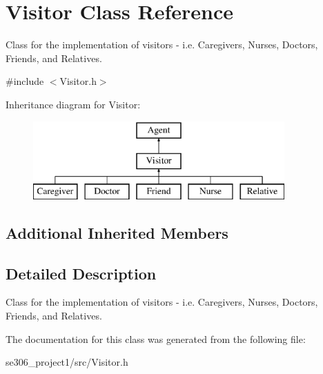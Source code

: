 \hypertarget{classVisitor}{\section{Visitor Class Reference}
\label{classVisitor}
}


Class for the implementation of visitors -\/ i.\-e. Caregivers, Nurses, Doctors, Friends, and Relatives.  




{\ttfamily \#include $<$Visitor.\-h$>$}

Inheritance diagram for Visitor\-:\begin{figure}[H]
\begin{center}
\leavevmode
\includegraphics[height=3.000000cm]{classVisitor}
\end{center}
\end{figure}
\subsection*{Additional Inherited Members}


\subsection{Detailed Description}
Class for the implementation of visitors -\/ i.\-e. Caregivers, Nurses, Doctors, Friends, and Relatives. 

The documentation for this class was generated from the following file\-:\begin{DoxyCompactItemize}
\item 
se306\-\_\-project1/src/Visitor.\-h\end{DoxyCompactItemize}
